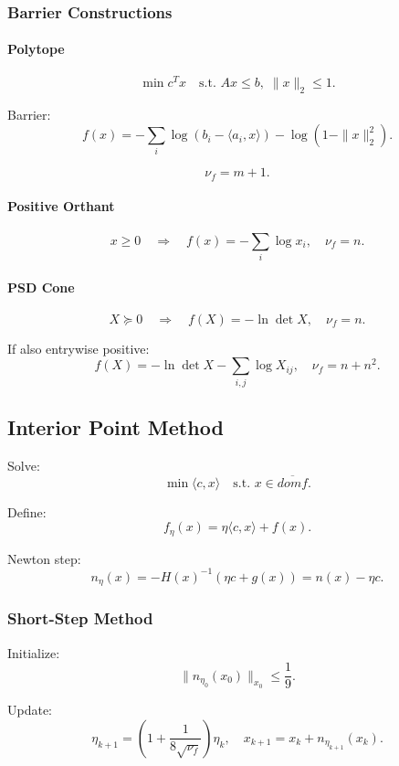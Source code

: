 \documentclass[12pt,oneside]{book}
\numberwithin{equation}{section}
\theoremstyle{definition}
\theoremstyle{plain}
\theoremstyle{remark}
\begin{document}
\subsubsection{Barrier Constructions}

\paragraph{Polytope}

\[
\min c^T x
\quad \text{s.t. } Ax \le b,\; \|x\|_2 \le 1.
\]

Barrier:
\[
f(x)
=
-\sum_i \log(b_i - \langle a_i,x\rangle)
- \log(1 - \|x\|_2^2).
\]

\[
\nu_f = m + 1.
\]

\paragraph{Positive Orthant}

\[
x \ge 0
\quad \Rightarrow \quad
f(x) = -\sum_i \log x_i,
\quad \nu_f = n.
\]

\paragraph{PSD Cone}

\[
X \succeq 0
\quad \Rightarrow \quad
f(X) = -\ln \det X,
\quad \nu_f = n.
\]

If also entrywise positive:
\[
f(X) = -\ln \det X - \sum_{i,j} \log X_{ij},
\quad \nu_f = n + n^2.
\]

\subsection{Interior Point Method}

Solve:
\[
\min \langle c,x\rangle
\quad \text{s.t. } x \in \overline{dom f}.
\]

Define:
\[
f_\eta(x) = \eta \langle c,x\rangle + f(x).
\]

Newton step:
\[
n_\eta(x)
=
-H(x)^{-1}(\eta c + g(x))
=
n(x) - \eta c.
\]

\subsubsection*{Short-Step Method}

Initialize:
\[
\|n_{\eta_0}(x_0)\|_{x_0} \le \frac{1}{9}.
\]

Update:
\[
\eta_{k+1}
=
\left(1 + \frac{1}{8\sqrt{\nu_f}}\right)\eta_k,
\quad
x_{k+1} = x_k + n_{\eta_{k+1}}(x_k).
\]
\end{document}
